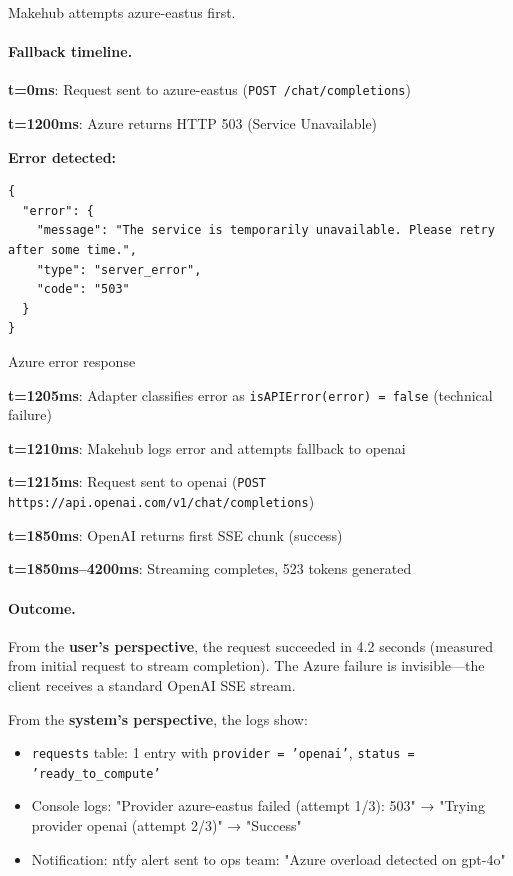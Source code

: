 \documentclass[english]{article}
\begin{document}
Makehub attempts azure-eastus first.

\paragraph{Fallback timeline.}

\textbf{t=0ms}: Request sent to azure-eastus (\texttt{POST /chat/completions})

\textbf{t=1200ms}: Azure returns HTTP 503 (Service Unavailable)

\textbf{Error detected:}
\begin{listing}[H]
\begin{verbatim}
{
  "error": {
    "message": "The service is temporarily unavailable. Please retry after some time.",
    "type": "server_error",
    "code": "503"
  }
}
\end{verbatim}
\caption{Azure error response}
\end{listing}

\textbf{t=1205ms}: Adapter classifies error as \texttt{isAPIError(error) = false} (technical failure)

\textbf{t=1210ms}: Makehub logs error and attempts fallback to openai

\textbf{t=1215ms}: Request sent to openai (\texttt{POST https://api.openai.com/v1/chat/completions})

\textbf{t=1850ms}: OpenAI returns first SSE chunk (success)

\textbf{t=1850ms--4200ms}: Streaming completes, 523 tokens generated

\paragraph{Outcome.}

From the \textbf{user's perspective}, the request succeeded in 4.2 seconds (measured from initial request to stream completion). The Azure failure is invisible—the client receives a standard OpenAI SSE stream.

From the \textbf{system's perspective}, the logs show:
\begin{itemize}
    \item \texttt{requests} table: 1 entry with \texttt{provider = 'openai'}, \texttt{status = 'ready\_to\_compute'}
    \item Console logs: "Provider azure-eastus failed (attempt 1/3): 503" → "Trying provider openai (attempt 2/3)" → "Success"
    \item Notification: ntfy alert sent to ops team: "Azure overload detected on gpt-4o"
\end{itemize}
\end{document}
